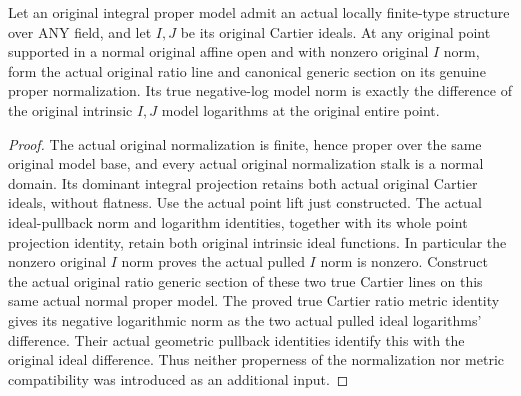 \begin{theorem}
\label{thm:actual-normalized-cartier-ratio-model-weight}
\leanok
{}
Let an original integral proper model admit an actual locally
finite-type structure over ANY field, and let $I,J$ be its
original Cartier ideals. At any original point supported in a
normal original affine open and with nonzero original $I$ norm,
form the actual original ratio line and canonical generic section
on its genuine proper normalization. Its true negative-log model
norm is exactly the difference of the original intrinsic $I,J$
model logarithms at the original entire point.
\end{theorem}
\begin{proof}
The actual original normalization is finite, hence proper over the
same original model base, and every actual original normalization
stalk is a normal domain. Its dominant integral projection retains
both actual original Cartier ideals, without flatness. Use the
actual point lift just constructed. The actual ideal-pullback norm
and logarithm identities, together with its whole point projection
identity, retain both original intrinsic ideal functions. In
particular the nonzero original $I$ norm proves the actual pulled
$I$ norm is nonzero. Construct the actual original ratio generic
section of these two true Cartier lines on this same actual normal
proper model. The proved true Cartier ratio metric identity gives
its negative logarithmic norm as the two actual pulled ideal
logarithms' difference. Their actual geometric pullback identities
identify this with the original ideal difference. Thus neither
properness of the normalization nor metric compatibility was
introduced as an additional input.
\end{proof}
